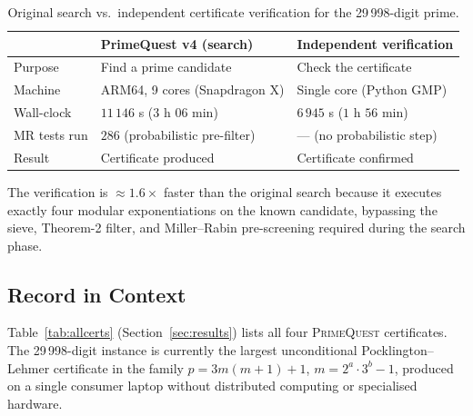 \begin{table}[h]
\centering
\caption{Original search vs.\ independent certificate verification
         for the 29\,998-digit prime.}
\label{tab:comparison29998}
\renewcommand{\arraystretch}{1.3}
\begin{tabular}{@{}lll@{}}
\toprule
 & \textbf{PrimeQuest v4 (search)} & \textbf{Independent verification} \\
\midrule
Purpose        & Find a prime candidate          & Check the certificate \\
Machine        & ARM64, 9 cores (Snapdragon X)   & Single core (Python GMP) \\
Wall-clock     & $11\,146$ s ($3$ h $06$ min)    & $6\,945$ s ($1$ h $56$ min) \\
MR tests run   & $286$ (probabilistic pre-filter) & — (no probabilistic step) \\
Result         & Certificate produced             & Certificate confirmed \\
\bottomrule
\end{tabular}
\end{table}

The verification is $\approx 1.6\times$ faster than the original search
because it executes exactly four modular exponentiations on the known
candidate, bypassing the sieve, Theorem-2 filter, and Miller–Rabin
pre-screening required during the search phase.

\subsection{Record in Context}

Table~\ref{tab:allcerts} (Section~\ref{sec:results}) lists all four
\textsc{PrimeQuest} certificates. The 29\,998-digit instance is currently
the largest unconditional Pocklington–Lehmer certificate in the family
$p = 3m(m+1)+1$, $m = 2^a\cdot 3^b - 1$, produced on a single consumer
laptop without distributed computing or specialised hardware.

% 
% 
% 
